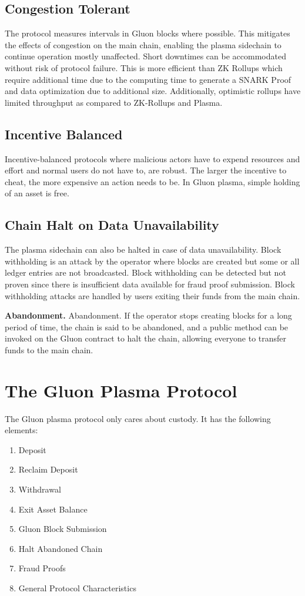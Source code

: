 \documentclass[12pt,a4paper]{article}
\begin{document}
\subsection{Congestion Tolerant}
The protocol measures intervals in Gluon blocks where possible. This mitigates the effects of congestion on the main chain, enabling the plasma sidechain to continue operation mostly unaffected. Short downtimes can be accommodated without risk of protocol failure. This is more efficient than ZK Rollups which require additional time due to the computing time to generate a SNARK Proof and data optimization due to additional size. Additionally, optimistic rollups have limited throughput as compared to ZK-Rollups and Plasma.

\subsection{Incentive Balanced}
Incentive-balanced protocols where malicious actors have to expend resources and effort and normal users do not have to, are robust. The larger the incentive to cheat, the more expensive an action needs to be. In Gluon plasma, simple holding of an asset is free.

\subsection{Chain Halt on Data Unavailability}
The plasma sidechain can also be halted in case of data unavailability. Block withholding is an attack by the operator where blocks are created but some or all ledger entries are not broadcasted. Block withholding can be detected but not proven since there is insufficient data available for fraud proof submission. Block withholding attacks are handled by users exiting their funds from the main chain.

\textbf{Abandonment.} Abandonment. If the operator stops creating blocks for a long period of time, the chain is said to be abandoned, and a public method can be invoked on the Gluon contract to halt the chain, allowing everyone to transfer funds to the main chain.

\section{The Gluon Plasma Protocol}

The Gluon plasma protocol only cares about custody. It has the following elements:

\begin{enumerate}
    \item Deposit
    \item Reclaim Deposit
    \item Withdrawal
    \item Exit Asset Balance
    \item Gluon Block Submission
    \item Halt Abandoned Chain
    \item Fraud Proofs
    \item General Protocol Characteristics
\end{enumerate}
\end{document}
